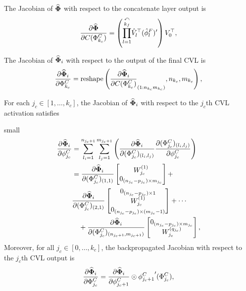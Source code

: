 \documentclass[letterpaper, journal]{IEEEtran}
\newcommand*{\cnnOut}{\Phi^C}
\newcommand*{\cnnAct}{\phi^C}
\begin{document}
The Jacobian of $\widehat{\boldsymbol{\Phi}}$ with respect to the concatenate layer output is
\begin{equation}
  \frac{\partial \estNN}{\partial C(\cnnOut_{k_c})}
  =
  \left(
    \overset{\curvearrowleft}{\prod_{l=1}^{k_f}}
    \hat V_l^\top (\hat \phi_l^F)'
  \right)
  V_0^\top
  ,
  \label{eq:dEstNN_dC}
\end{equation}

The Jacobian of $\widehat{\boldsymbol{\Phi}}_i$ with respect to the output of the final CVL is
\begin{equation}
  \frac{\partial \estNN_i}{\partial \cnnOut_{k_c}}
  =
  \operatorname{reshape}
  \left(
    \frac{\partial \estNN_i}{\partial C(\cnnOut_{k_c})}_{(1:n_{k_c}m_{k_c})},
    n_{k_c},
    m_{k_c}
  \right)
  ,
  \label{eq:dEstNNi_dcnnOutkc}
\end{equation}

For each $j_c \in [1,\dots,k_c]$, the Jacobian of $\widehat{\boldsymbol{\Phi}}_i$ with respect to
the $j_c$th CVL activation satisfies

{small
\begin{equation}
  \begin{aligned}
    \frac{\partial \estNN_i}{\partial \cnnAct_{j_c}}
    &=
    \sum_{l_i=1}^{n_{j_c+1}} \sum_{l_j=1}^{m_{j_c+1}}
    \left(
      \frac{\partial \estNN_i}{\partial (\cnnOut_{j_c})_{(l_i,l_j)}}
      \frac{\partial (\cnnOut_{j_c})_{(l_i,l_j)}}{\partial \cnnAct_{j_c}}
    \right)
    \\
    &=
    \frac{\partial \estNN_i}{\partial (\cnnOut_{j_c})_{(1,1)}}
    \begin{bmatrix}
      W_{j_c}^{(1)}\\
      0_{(n_{j_c}-p_{j_c})\times m_{j_c}}
    \end{bmatrix}
    + \\&
    \frac{\partial \estNN_i}{\partial (\cnnOut_{j_c})_{(2,1)}}
    \begin{bmatrix}
      0_{(n_{j_c}-p_{j_c})\times 1}\\
      W_{j_c}^{(1)}\\
      0_{(n_{j_c}-p_{j_c})\times (m_{j_c}-1)}
    \end{bmatrix}
    + \cdots
    \\
    &\quad +
    \frac{\partial \estNN_i}{\partial (\cnnOut_{j_c})_{(n_{j_c+1},m_{j_c+1})}}
    \begin{bmatrix}
      0_{(n_{j_c}-p_{j_c})\times m_{j_c}}\\
      W_{j_c}^{(q_{j_c})}
    \end{bmatrix}
    ,
  \end{aligned}
\end{equation}
}
Moreover, for all $j_c \in [0,\dots,k_c]$, the backpropagated Jacobian with
respect to the $j_c$th CVL output is
\begin{equation}
  \frac{\partial \estNN_i}{\partial \cnnOut_{j_c}}
  =
  \frac{\partial \estNN_i}{\partial \cnnAct_{j_c+1}}
  \odot
  {\cnnAct_{j_c+1}}'(\cnnOut_{j_c})
  ,
  \label{eq:dEstNNi_dcnnOutjc}
\end{equation}
\end{document}
